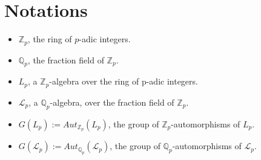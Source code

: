 \documentclass[12pt]{article}
\begin{document}
\section{Notations}
\begin{itemize}
\item $\mathbb{Z}_p$, the ring of $p$-adic integers.
\item $\mathbb{Q}_p$, the fraction field of $\mathbb{Z}_p$.
\item $L_p$, a $\mathbb{Z}_p$-algebra over the ring of p-adic integers.
\item $\mathcal{L}_p$, a $\mathbb{Q}_p$-algebra, over the fraction field of $\mathbb{Z}_p$.
\item $G(L_p):=Aut_{\mathbb{Z}_p}(L_p)$, the group of $\mathbb{Z}_p$-automorphisms of $L_p$.
\item $G(\mathcal{L}_p):=Aut_{\mathbb{Q}_p}(\mathcal{L}_p)$, the group of $\mathbb{Q}_p$-automorphisms of $\mathcal{L}_p$.
\end{itemize}
\end{document}
